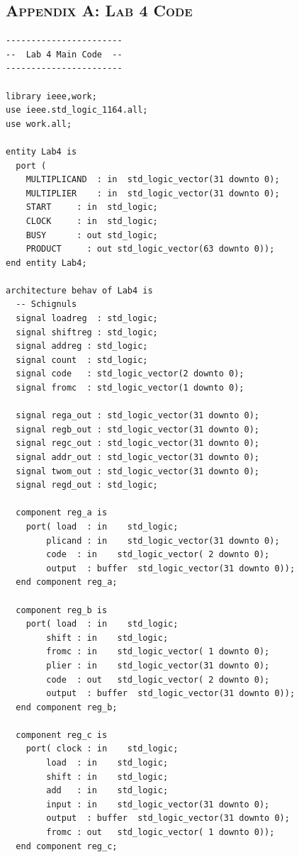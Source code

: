 \documentclass[11pt]{report}
\begin{document}
\begin{spacing}{1.5}


\clearpage

\chapter*{\scshape Appendix A: Lab 4 Code}
\label{app:a}

\vspace{15px}
\begin{lstlisting}
-----------------------
--  Lab 4 Main Code  --
-----------------------

library ieee,work;
use ieee.std_logic_1164.all;
use work.all;

entity Lab4 is
  port (
    MULTIPLICAND  : in  std_logic_vector(31 downto 0);
    MULTIPLIER    : in  std_logic_vector(31 downto 0);
    START     : in  std_logic;
    CLOCK     : in  std_logic;
    BUSY      : out std_logic;
    PRODUCT     : out std_logic_vector(63 downto 0));
end entity Lab4;

architecture behav of Lab4 is
  -- Schignuls
  signal loadreg  : std_logic;
  signal shiftreg : std_logic;
  signal addreg : std_logic;
  signal count  : std_logic;
  signal code   : std_logic_vector(2 downto 0);
  signal fromc  : std_logic_vector(1 downto 0);

  signal rega_out : std_logic_vector(31 downto 0);
  signal regb_out : std_logic_vector(31 downto 0);
  signal regc_out : std_logic_vector(31 downto 0);
  signal addr_out : std_logic_vector(31 downto 0);
  signal twom_out : std_logic_vector(31 downto 0);
  signal regd_out : std_logic;

  component reg_a is
    port( load  : in    std_logic;
        plicand : in    std_logic_vector(31 downto 0);
        code  : in    std_logic_vector( 2 downto 0);
        output  : buffer  std_logic_vector(31 downto 0));
  end component reg_a;

  component reg_b is
    port( load  : in    std_logic;
        shift : in    std_logic;
        fromc : in    std_logic_vector( 1 downto 0);
        plier : in    std_logic_vector(31 downto 0);
        code  : out   std_logic_vector( 2 downto 0);
        output  : buffer  std_logic_vector(31 downto 0));
  end component reg_b;    

  component reg_c is
    port( clock : in    std_logic;
        load  : in    std_logic;
        shift : in    std_logic;
        add   : in    std_logic;
        input : in    std_logic_vector(31 downto 0);
        output  : buffer  std_logic_vector(31 downto 0);
        fromc : out   std_logic_vector( 1 downto 0));
  end component reg_c;


\end{lstlisting}
\end{spacing}
\end{document}
